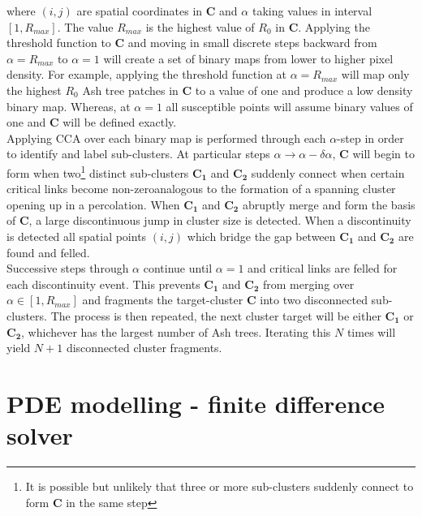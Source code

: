 where $(i,j)$ are spatial coordinates in $\mathbf{C}$ and $\alpha$ taking values in interval $[1, R_{max}]$. The value $R_{max}$ is the highest value of $R_0$ in $\mathbf{C}$. Applying the threshold function to $\mathbf{C}$ and moving in small discrete steps backward from $\alpha = R_{max}$ to $\alpha=1$ will create a set of binary maps from lower to higher pixel density. For example, applying the threshold function at $\alpha = R_{max}$ will map only the highest $R_0$ Ash tree patches in $\mathbf{C}$ to a value of one and produce a low density binary map. Whereas, at $\alpha=1$ all susceptible points will assume binary values of one and $\mathbf{C}$ will be defined exactly.\\

Applying CCA over each binary map is performed through each $\alpha$-step in order to identify and label sub-clusters. At particular steps $\alpha \rightarrow \alpha - \delta\alpha$, $\mathbf{C}$ will begin to form when two\footnote{It is possible but unlikely that three or more sub-clusters suddenly connect to form $\mathbf{C}$ in the same step} distinct sub-clusters $\mathbf{C_1}$ and $\mathbf{C_2}$ suddenly connect when certain critical links become non-zero\textemdash analogous to the formation of a spanning cluster opening up in a percolation. When $\mathbf{C_1}$ and $\mathbf{C_2}$ abruptly merge and form the basis of $\mathbf{C}$, a large discontinuous jump in cluster size is detected. When a discontinuity is detected all spatial points $(i,j)$ which bridge the gap between $\mathbf{C_1}$ and $\mathbf{C_2}$ are found and felled.\\

Successive steps through $\alpha$ continue until $\alpha=1$ and critical links are felled for each discontinuity event. This prevents $\mathbf{C_1}$ and $\mathbf{C_2}$ from merging over $\alpha \in [1, R_{max}]$ and fragments the target-cluster $\mathbf{C}$ into two disconnected sub-clusters. The process is then repeated, the next cluster target will be either $\mathbf{C_1}$ or $\mathbf{C_2}$, whichever has the largest number of Ash trees. Iterating this $N$ times will yield $N+1$ disconnected cluster fragments.\\

\chapter{PDE modelling - finite difference solver}

\label{a:pde}

